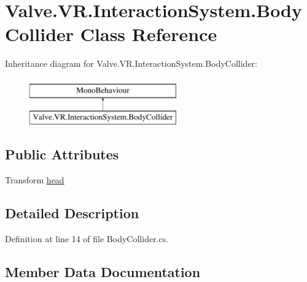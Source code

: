\hypertarget{class_valve_1_1_v_r_1_1_interaction_system_1_1_body_collider}{}\section{Valve.\+V\+R.\+Interaction\+System.\+Body\+Collider Class Reference}
\label{class_valve_1_1_v_r_1_1_interaction_system_1_1_body_collider}
Inheritance diagram for Valve.\+V\+R.\+Interaction\+System.\+Body\+Collider\+:\begin{figure}[H]
\begin{center}
\leavevmode
\includegraphics[height=2.000000cm]{class_valve_1_1_v_r_1_1_interaction_system_1_1_body_collider}
\end{center}
\end{figure}
\subsection*{Public Attributes}
\begin{DoxyCompactItemize}
\item 
Transform \mbox{\hyperlink{class_valve_1_1_v_r_1_1_interaction_system_1_1_body_collider_a0856dc4b7fc1ef4871db670e8e2c50c9}{head}}
\end{DoxyCompactItemize}


\subsection{Detailed Description}


Definition at line 14 of file Body\+Collider.\+cs.



\subsection{Member Data Documentation}
\mbox{\label{class_valve_1_1_v_r_1_1_interaction_system_1_1_body_collider_a0856dc4b7fc1ef4871db670e8e2c50c9}} 
